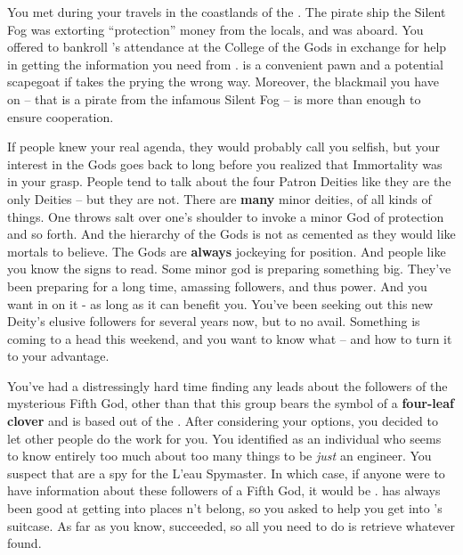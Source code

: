 \documentclass[char]{GL2020}
\begin{document}
You met \cPirateChild{} during your travels in the coastlands of the \pFarm{}. The pirate ship the Silent Fog was extorting ``protection'' money from the locals, and \cPirateChild{}  was aboard. You offered to bankroll \cPirateChild{}'s attendance at the College of the Gods in exchange for \cPirateChild{\their} help in getting the information you need from \cDisney{}. \cPirateChild{} is a convenient pawn and a potential scapegoat if \cDisney{} takes the prying the wrong way. Moreover, the blackmail you have on \cPirateChild{} – that \cPirateChild{\they} is a pirate from the infamous Silent Fog – is more than enough to ensure \cPirateChild{\their} cooperation.

If people knew your real agenda, they would probably call you selfish, but your interest in the Gods goes back to long before you realized that Immortality was in your grasp. People tend to talk about the four Patron Deities like they are the only Deities -- but they are not. There are \textbf{many} minor deities, of all kinds of things. One throws salt over one’s shoulder to invoke a minor God of protection and so forth. And the hierarchy of the Gods is not as cemented as they would like mortals to believe. The Gods are \textbf{always} jockeying for position. And people like you know the signs to read. Some minor god is preparing something big. They've been preparing for a long time, amassing followers, and thus power. And you want in on it - as long as it can benefit you. You’ve been seeking out this new Deity's elusive followers for several years now, but to no avail. Something is coming to a head this weekend, and you want to know what -- and how to turn it to your advantage.

You've had a distressingly hard time finding any leads about the followers of the mysterious Fifth God, other than that this group bears the symbol of a \textbf{four-leaf clover} and is based out of the \pShippies{}. After considering your options, you decided to let other people do the work for you. You identified \cBunker{\full} as an individual who seems to know entirely too much about too many things to be \emph{just} an engineer. You suspect that \cBunker{\they} are a spy for the L'eau Spymaster. In which case, if anyone were to have information about these followers of a Fifth God, it would be \cBunker{}. \cDisney{} has always been good at getting into places \cDisney{\they} \cDisney{\does}n’t belong, so you asked \cDisney{\them} to help you get into \cBunker{}’s suitcase. As far as you know, \cDisney{\they} succeeded, so all you need to do is retrieve whatever \cDisney{\they} found.
\end{document}
